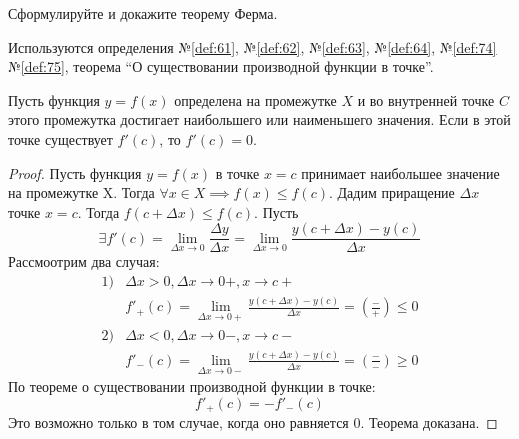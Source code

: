 \begin{question}
    Сформулируйте и докажите теорему Ферма.
\end{question}
\begin{used}
    Используются определения №\ref{def:61}, №\ref{def:62}, №\ref{def:63}, №\ref{def:64}, №\ref{def:74} №\ref{def:75}, теорема ``О существовании производной функции в точке''.
\end{used}
\begin{theorem}
    Пусть функция $y = f(x)$ определена на промежутке $X$ и во внутренней точке $C$ этого промежутка достигает наибольшего или наименьшего значения. Если в этой точке существует $f'(c)$, то $f'(c) = 0$.
\end{theorem}
\begin{proof}
    Пусть функция $y = f(x)$ в точке  $x = c$ принимает наибольшее значение на промежутке X. Тогда $\forall x \in X \implies f(x) \le f(c)$. Дадим приращение $\Delta x$ точке $x = c$. Тогда $f(c + \Delta x) \le f(c)$. Пусть \[
        \exists f'(c) = \lim_{\Delta x \to 0} \frac{\Delta y}{\Delta x} = \lim_{\Delta x \to 0} \frac{y(c + \Delta x) - y(c)}{\Delta x}
    \]
    Рассмоотрим два случая:
    \begin{align*}
        1) &\Delta x > 0, \Delta x \to 0+, x \to c+ \\
        &f'_+(c) = \lim_{\Delta x \to 0+} \frac{y(c + \Delta x) - y(c)}{\Delta x} = \left( \frac{-}{+} \right) \le 0 \\
        2) &\Delta x < 0, \Delta x \to 0-, x \to c- \\
        &f'_-(c) = \lim_{\Delta x \to 0-} \frac{y(c + \Delta x) - y(c)}{\Delta x} = \left( \frac{-}{-} \right) \ge 0
    \end{align*}
    По теореме о существовании производной функции в точке: \[
        f'_+(c) = -f'_-(c)
    \] 
    Это возможно только в том случае, когда оно равняется $0$. Теорема доказана. 
\end{proof}
\pagebreak



